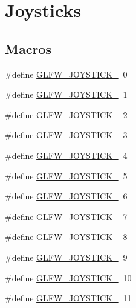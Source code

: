 \hypertarget{group__joysticks}{}\section{Joysticks}
\label{group__joysticks}
\subsection*{Macros}
\begin{DoxyCompactItemize}
\item 
\#define \hyperlink{group__joysticks_ga34a0443d059e9f22272cd4669073f73d}{G\+L\+F\+W\+\_\+\+J\+O\+Y\+S\+T\+I\+C\+K\+\_}~0
\item 
\#define \hyperlink{group__joysticks_ga6eab65ec88e65e0850ef8413504cb50c}{G\+L\+F\+W\+\_\+\+J\+O\+Y\+S\+T\+I\+C\+K\+\_}~1
\item 
\#define \hyperlink{group__joysticks_gae6f3eedfeb42424c2f5e3161efb0b654}{G\+L\+F\+W\+\_\+\+J\+O\+Y\+S\+T\+I\+C\+K\+\_}~2
\item 
\#define \hyperlink{group__joysticks_ga97ddbcad02b7f48d74fad4ddb08fff59}{G\+L\+F\+W\+\_\+\+J\+O\+Y\+S\+T\+I\+C\+K\+\_}~3
\item 
\#define \hyperlink{group__joysticks_gae43281bc66d3fa5089fb50c3e7a28695}{G\+L\+F\+W\+\_\+\+J\+O\+Y\+S\+T\+I\+C\+K\+\_}~4
\item 
\#define \hyperlink{group__joysticks_ga74771620aa53bd68a487186dea66fd77}{G\+L\+F\+W\+\_\+\+J\+O\+Y\+S\+T\+I\+C\+K\+\_}~5
\item 
\#define \hyperlink{group__joysticks_ga20a9f4f3aaefed9ea5e66072fc588b87}{G\+L\+F\+W\+\_\+\+J\+O\+Y\+S\+T\+I\+C\+K\+\_}~6
\item 
\#define \hyperlink{group__joysticks_ga21a934c940bcf25db0e4c8fe9b364bdb}{G\+L\+F\+W\+\_\+\+J\+O\+Y\+S\+T\+I\+C\+K\+\_}~7
\item 
\#define \hyperlink{group__joysticks_ga87689d47df0ba6f9f5fcbbcaf7b3cecf}{G\+L\+F\+W\+\_\+\+J\+O\+Y\+S\+T\+I\+C\+K\+\_}~8
\item 
\#define \hyperlink{group__joysticks_gaef55389ee605d6dfc31aef6fe98c54ec}{G\+L\+F\+W\+\_\+\+J\+O\+Y\+S\+T\+I\+C\+K\+\_}~9
\item 
\#define \hyperlink{group__joysticks_gae7d26e3df447c2c14a569fcc18516af4}{G\+L\+F\+W\+\_\+\+J\+O\+Y\+S\+T\+I\+C\+K\+\_}~10
\item 
\#define \hyperlink{group__joysticks_gab91bbf5b7ca6be8d3ac5c4d89ff48ac7}{G\+L\+F\+W\+\_\+\+J\+O\+Y\+S\+T\+I\+C\+K\+\_}~11
\item 

\end{DoxyCompactItemize}
